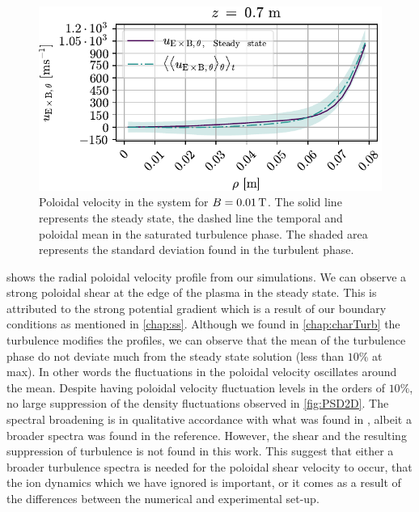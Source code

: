 %
\begin{figure}[htbp]
    \centering
    \includegraphics{fig/results/poloidalFlow/poloidalFlow01}
    \caption{Poloidal velocity in the system for $B=0.01\, \text{T}$.
        The solid line represents the steady state, the dashed line the temporal and poloidal mean in the saturated turbulence phase.
        The shaded area represents the standard deviation found in the turbulent phase.}
    \label{fig:poloidalFlow0008}
\end{figure}
%
 shows the radial poloidal velocity profile from our simulations.
We can observe a strong poloidal shear at the edge of the plasma in the steady state.
This is attributed to the strong potential gradient which is a result of our boundary conditions as mentioned in \cref{chap:ss}.
Although we found in \cref{chap:charTurb} the turbulence modifies the profiles, we can observe that the mean of the turbulence phase do not deviate much from the steady state solution (less than $10\%$ at max).
In other words the fluctuations in the poloidal velocity oscillates around the mean.
Despite having poloidal velocity fluctuation levels in the orders of $10\%$, no large suppression of the density fluctuations observed in \cref{fig:PSD2D}.
The spectral broadening is in qualitative accordance with what was found in \cite{Tynan2006a}, albeit a broader spectra was found in the reference.
However, the shear and the resulting suppression of turbulence is not found in this work.
This suggest that either a broader turbulence spectra is needed for the poloidal shear velocity to occur, that the ion dynamics which we have ignored is important, or it comes as a result of the differences between the numerical and experimental set-up.
%
